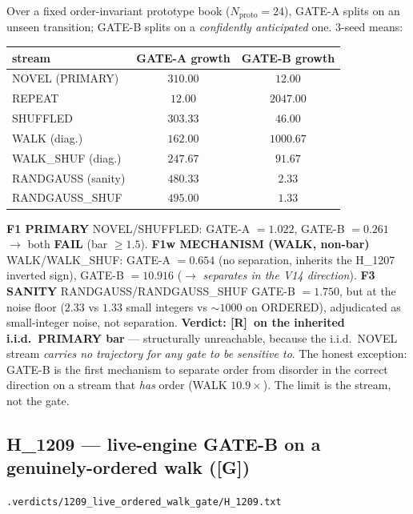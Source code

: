 \documentclass[11pt,a4paper]{article}
\providecommand{\tierGreen}{\textbf{[G]}}
\providecommand{\tierRed}{\textbf{[R]}}
\newcommand{\verdict}[1]{\texttt{\small #1}}
\begin{document}
Over a fixed order-invariant prototype book ($N_{\text{proto}}=24$), GATE-A
splits on an unseen transition; GATE-B splits on a \emph{confidently anticipated}
one. $3$-seed means:
\begin{center}
\begin{tabular}{lcc}
\toprule
stream & GATE-A growth & GATE-B growth \\
\midrule
NOVEL (PRIMARY)    & $310.00$ & $12.00$ \\
REPEAT             & $12.00$  & $2047.00$ \\
SHUFFLED           & $303.33$ & $46.00$ \\
WALK (diag.)       & $162.00$ & $1000.67$ \\
WALK\_SHUF (diag.) & $247.67$ & $91.67$ \\
RANDGAUSS (sanity) & $480.33$ & $2.33$ \\
RANDGAUSS\_SHUF    & $495.00$ & $1.33$ \\
\bottomrule
\end{tabular}
\end{center}
\textbf{F1 PRIMARY} NOVEL/SHUFFLED: GATE-A $=1.022$, GATE-B $=0.261$ $\to$ both
\textbf{FAIL} (bar $\ge 1.5$). \textbf{F1w MECHANISM (WALK, non-bar)}
WALK/WALK\_SHUF: GATE-A $=0.654$ (no separation, inherits the H\_1207 inverted
sign), GATE-B $=10.916$ ($\to$ \emph{separates in the V14 direction}).
\textbf{F3 SANITY} RANDGAUSS/RANDGAUSS\_SHUF GATE-B $=1.750$, but at the noise
floor ($2.33$ vs $1.33$ small integers vs $\sim 1000$ on ORDERED), adjudicated as
small-integer noise, not separation. \textbf{Verdict: \tierRed\ on the inherited
i.i.d.\ PRIMARY bar} --- structurally unreachable, because the i.i.d.\ NOVEL
stream \emph{carries no trajectory for any gate to be sensitive to}. The honest
exception: GATE-B is the first mechanism to separate order from disorder in the
correct direction on a stream that \emph{has} order (WALK $10.9\times$). The
limit is the stream, not the gate.

\subsection{H\_1209 --- live-engine GATE-B on a genuinely-ordered walk (\tierGreen)}
\label{sec:trajectory}
\noindent\verdict{.verdicts/1209\_live\_ordered\_walk\_gate/H\_1209.txt}
\end{document}
